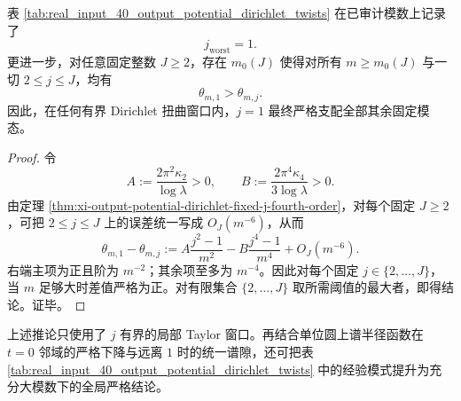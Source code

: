\begin{corollary}[有界单位根窗口内的最坏模态最终由 \texorpdfstring{$j=1$}{j=1} 实现]\label{cor:xi-output-potential-dirichlet-bounded-window-j1}
表 \ref{tab:real_input_40_output_potential_dirichlet_twists} 在已审计模数上记录了
\[
j_{\mathrm{worst}}=1.
\]
更进一步，对任意固定整数 \(J\ge 2\)，存在 \(m_0(J)\) 使得对所有 \(m\ge m_0(J)\) 与一切 \(2\le j\le J\)，均有
\[
\theta_{m,1}>\theta_{m,j}.
\]
因此，在任何有界 Dirichlet 扭曲窗口内，\(j=1\) 最终严格支配全部其余固定模态。
\end{corollary}
\begin{proof}
令
\[
A:=\frac{2\pi^2\kappa_2}{\log\lambda}>0,
\qquad
B:=\frac{2\pi^4\kappa_4}{3\log\lambda}>0.
\]
由定理 \ref{thm:xi-output-potential-dirichlet-fixed-j-fourth-order}，对每个固定 \(J\ge 2\)，可把 \(2\le j\le J\) 上的误差统一写成 \(O_J(m^{-6})\)，从而
\[
\theta_{m,1}-\theta_{m,j}
:=
A\frac{j^2-1}{m^2}
-B\frac{j^4-1}{m^4}
+O_J(m^{-6}).
\]
右端主项为正且阶为 \(m^{-2}\)；其余项至多为 \(m^{-4}\)。因此对每个固定 \(j\in\{2,\dots,J\}\)，当 \(m\) 足够大时差值严格为正。对有限集合 \(\{2,\dots,J\}\) 取所需阈值的最大者，即得结论。证毕。
\end{proof}

\noindent 上述推论只使用了 \(j\) 有界的局部 Taylor 窗口。再结合单位圆上谱半径函数在 \(t=0\) 邻域的严格下降与远离 \(1\) 时的统一谱隙，还可把表 \ref{tab:real_input_40_output_potential_dirichlet_twists} 中的经验模式提升为充分大模数下的全局严格结论。
